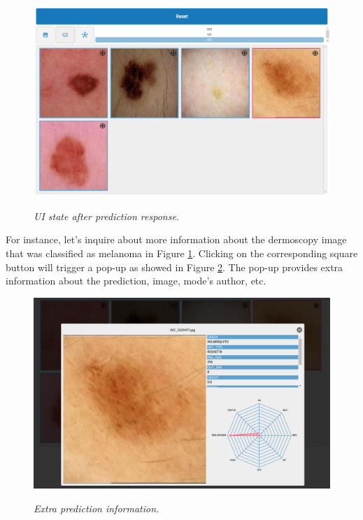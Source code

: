 \begin{figure}[H]
  \centering
  \begin{adjustbox}{width=0.9\textwidth, trim={0cm 3.55cm 0cm 0cm}, clip}
    \includegraphics[width=\textwidth]{imatges/results/after-prediction.png}
  \end{adjustbox}
  \caption[UI state after prediction response]{\textit{UI state after prediction response.}}
  {\label{fig:after-prediction}}
\end{figure}


For instance, let's inquire about more information about the dermoscopy image
that was classified as melanoma in Figure \ref{fig:after-prediction}. Clicking
on the corresponding square button will trigger a pop-up as showed in Figure
\ref{fig:extra-inf-popup}. The pop-up provides extra information about the
prediction, image, mode's author, etc.

\begin{figure}[H]
  \centering
  \begin{adjustbox}{width=0.9\textwidth, trim={0.05cm 0cm 0.25cm 0cm}, clip}
    \includegraphics[]{imatges/results/extra-inf-popup.png}
  \end{adjustbox}
  \caption[Extra prediction information]{\textit{Extra prediction information.}}
  {\label{fig:extra-inf-popup}}
\end{figure}


